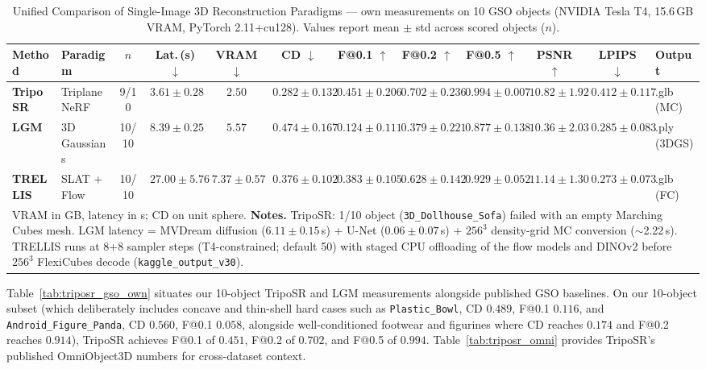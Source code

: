 \documentclass[10pt, conference]{IEEEtran}
\begin{document}
\begin{table}[t]
\centering
\caption{Unified Comparison of Single-Image 3D Reconstruction Paradigms --- own measurements on 10 GSO objects (NVIDIA Tesla T4, 15.6\,GB VRAM, PyTorch 2.11+cu128). Values report mean $\pm$ std across scored objects ($n$).}
\label{tab:unified_comparison}
{\tiny\setlength{\tabcolsep}{1.8pt}
\begin{tabular}{llcccccccccl}
\toprule
\textbf{Method} & \textbf{Paradigm} & $n$ & \textbf{Lat.\,(s)} $\downarrow$ & \textbf{VRAM} $\downarrow$ & \textbf{CD} $\downarrow$ & \textbf{F@0.1} $\uparrow$ & \textbf{F@0.2} $\uparrow$ & \textbf{F@0.5} $\uparrow$ & \textbf{PSNR} $\uparrow$ & \textbf{LPIPS} $\downarrow$ & \textbf{Output} \\
\midrule
\textbf{TripoSR} \cite{triposr2024} & Triplane NeRF & 9/10 & $\mathbf{3.61 \pm 0.28}$ & $\mathbf{2.50}$ & $\mathbf{0.282 \pm 0.132}$ & $\mathbf{0.451 \pm 0.206}$ & $\mathbf{0.702 \pm 0.236}$ & $\mathbf{0.994 \pm 0.007}$ & $\mathbf{10.82 \pm 1.92}$ & $0.412 \pm 0.117$ & .glb (MC) \\
\textbf{LGM} \cite{lgm2024} & 3D Gaussians & 10/10 & $8.39 \pm 0.25$ & $5.57$ & $0.474 \pm 0.167$ & $0.124 \pm 0.111$ & $0.379 \pm 0.221$ & $0.877 \pm 0.138$ & $10.36 \pm 2.03$ & $0.285 \pm 0.083$ & .ply (3DGS) \\
\textbf{TRELLIS} \cite{trellis2024} & SLAT + Flow & 10/10 & $27.00 \pm 5.76$ & $7.37 \pm 0.57$ & $0.376 \pm 0.102$ & $0.383 \pm 0.105$ & $0.628 \pm 0.142$ & $0.929 \pm 0.052$ & $11.14 \pm 1.30$ & $\mathbf{0.273 \pm 0.073}$ & .glb (FC) \\
\bottomrule
\multicolumn{12}{p{17.5cm}}{\footnotesize VRAM in GB, latency in s; CD on unit sphere. \textbf{Notes.} TripoSR: 1/10 object (\texttt{3D\_Dollhouse\_Sofa}) failed with an empty Marching Cubes mesh. LGM latency = MVDream diffusion ($6.11 \pm 0.15$\,s) + U-Net ($0.06 \pm 0.07$\,s) + $256^3$ density-grid MC conversion ($\sim$2.22\,s). TRELLIS runs at 8+8 sampler steps (T4-constrained; default 50) with staged CPU offloading of the flow models and DINOv2 before $256^3$ FlexiCubes decode (\texttt{kaggle\_output\_v30}).}
\end{tabular}}
\end{table}

Table~\ref{tab:triposr_gso_own} situates our 10-object TripoSR and LGM measurements alongside published GSO baselines. On our 10-object subset (which deliberately includes concave and thin-shell hard cases such as \texttt{Plastic\_Bowl}, CD $0.489$, F@0.1 $0.116$, and \texttt{Android\_Figure\_Panda}, CD $0.560$, F@0.1 $0.058$, alongside well-conditioned footwear and figurines where CD reaches $0.174$ and F@0.2 reaches $0.914$), TripoSR achieves F@0.1 of $0.451$, F@0.2 of $0.702$, and F@0.5 of $0.994$. Table~\ref{tab:triposr_omni} provides TripoSR's published OmniObject3D numbers for cross-dataset context.
\end{document}

